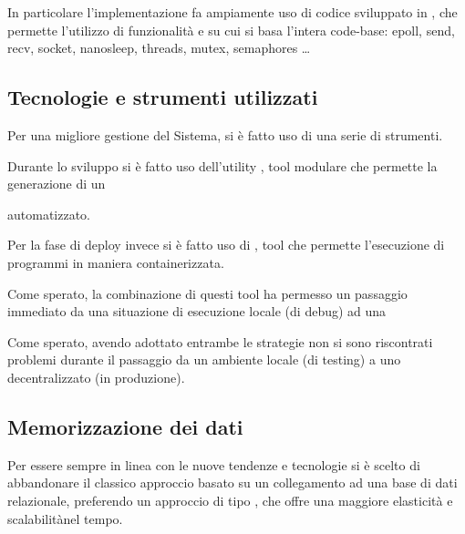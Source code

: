         In particolare l'implementazione fa ampiamente uso di codice sviluppato in , che permette l'utilizzo di funzionalità
        e \footnotemark su cui si basa l'intera code-base: epoll, send, recv, socket, nanosleep, threads, mutex, semaphores \dots

    \subsection{Tecnologie e strumenti utilizzati}
      Per una migliore gestione del Sistema, si è fatto uso di una serie di strumenti.

      Durante lo sviluppo si è fatto uso dell'utility \footnotemark {} , tool modulare che permette la generazione di un \footnotemark

      automatizzato.


      Per la fase di deploy invece si è fatto uso di , tool che permette l'esecuzione di programmi in maniera containerizzata.

      Come sperato, la combinazione di questi tool ha permesso un passaggio immediato da una situazione di esecuzione locale (di debug) ad una 

      Come sperato, avendo adottato entrambe le strategie non si sono riscontrati problemi durante il passaggio da un ambiente locale (di testing) a uno decentralizzato (in produzione).
    \subsection{Memorizzazione dei dati}
    Per essere sempre in linea con le nuove tendenze e tecnologie si è scelto di abbandonare il classico approccio basato su un collegamento ad una base di dati relazionale, preferendo un approccio di tipo \footnotemark ,  che offre una maggiore elasticità \footnotemark {}
    e scalabilità\footnotemark nel tempo.

